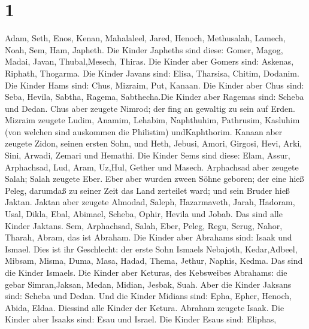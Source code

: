 \hypertarget{section}{%
\section{1}\label{section}}

 Adam, Seth, Enos,  Kenan, Mahalaleel, Jared,
 Henoch, Methusalah, Lamech,  Noah, Sem, Ham,
Japheth.  Die Kinder Japheths sind diese: Gomer, Magog,
Madai, Javan, Thubal,Mesech, Thiras.  Die Kinder aber Gomers
sind: Askenas, Riphath, Thogarma.  Die Kinder Javans sind:
Elisa, Tharsisa, Chitim, Dodanim.  Die Kinder Hams sind:
Chus, Mizraim, Put, Kanaan.  Die Kinder aber Chus sind:
Seba, Hevila, Sabtha, Ragema, Sabthecha.Die Kinder aber Ragemas sind:
Scheba und Dedan.  Chus aber zeugete Nimrod; der fing an
gewaltig zu sein auf Erden.  Mizraim zeugete Ludim, Anamim,
Lehabim, Naphthuhim,  Pathrusim, Kasluhim (von welchen sind
auskommen die Philistim) undKaphthorim.  Kanaan aber
zeugete Zidon, seinen ersten Sohn, und Heth,  Jebusi,
Amori, Girgosi,  Hevi, Arki, Sini,  Arwadi,
Zemari und Hemathi.  Die Kinder Sems sind diese: Elam,
Assur, Arphachsad, Lud, Aram, Uz,Hul, Gether und Masech. 
Arphachsad aber zeugete Salah; Salah zeugete Eber.  Eber
aber wurden zween Söhne geboren; der eine hieß Peleg, darumdaß zu seiner
Zeit das Land zerteilet ward; und sein Bruder hieß Jaktan. 
Jaktan aber zeugete Almodad, Saleph, Hazarmaveth, Jarah, 
Hadoram, Usal, Dikla,  Ebal, Abimael, Scheba, 
Ophir, Hevila und Jobab. Das sind alle Kinder Jaktans. 
Sem, Arphachsad, Salah,  Eber, Peleg, Regu, 
Serug, Nahor, Tharah,  Abram, das ist Abraham.
 Die Kinder aber Abrahams sind: Isaak und Ismael.
 Dies ist ihr Geschlecht: der erste Sohn Ismaels Nebajoth,
Kedar,Adbeel, Mibsam,  Misma, Duma, Masa, Hadad, Thema,
 Jethur, Naphis, Kedma. Das sind die Kinder Ismaels.
 Die Kinder aber Keturas, des Kebsweibes Abrahams: die
gebar Simran,Jaksan, Medan, Midian, Jesbak, Suah. Aber die Kinder
Jaksans sind: Scheba und Dedan.  Und die Kinder Midians
sind: Epha, Epher, Henoch, Abida, Eldaa. Diessind alle Kinder der
Ketura.  Abraham zeugete Isaak. Die Kinder aber Isaaks
sind: Esau und Israel.  Die Kinder Esaus sind: Eliphas,

